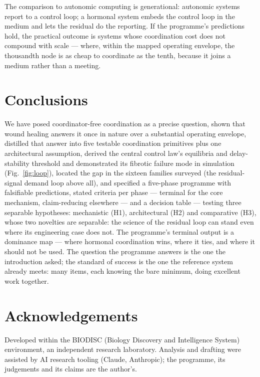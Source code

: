 \documentclass[twoside,twocolumn,usenatbib]{mnras}
\begin{document}
The comparison to autonomic computing
\citep{kephart2003} is generational: autonomic systems report to a
control loop; a hormonal system embeds the control loop in the
medium and lets the residual do the reporting. If the programme's
predictions hold, the practical outcome is systems whose coordination
cost does not compound with scale --- where, within the mapped
operating envelope, the thousandth node is as
cheap to coordinate as the tenth, because it joins a medium rather
than a meeting.

\section{Conclusions}
\label{sec:conclusions}

We have posed coordinator-free coordination as a precise question,
shown that wound healing answers it once in nature over a substantial
operating envelope, distilled that answer into five testable
coordination primitives plus one architectural assumption,
derived the central control law's equilibria and delay-stability
threshold and demonstrated its fibrotic failure mode in
simulation (Fig.~\ref{fig:loop}), located the
gap in the sixteen families surveyed (the residual-signal demand loop
above all), and specified a five-phase programme with falsifiable
predictions, stated criteria per phase --- terminal for the core
mechanism, claim-reducing elsewhere --- and a decision table ---
testing
three separable hypotheses: mechanistic (H1), architectural (H2) and
comparative (H3), whose two novelties are separable: the science of
the residual loop can stand even where its engineering case does not.
The programme's terminal output is a dominance map --- where hormonal
coordination wins, where it ties, and where it should not be used.
The
question the programme answers is the one the introduction asked; the
standard of success is the one the reference system already meets:
many items, each knowing the bare minimum, doing excellent work
together.

\section*{Acknowledgements}

Developed within the BIODISC (Biology Discovery and Intelligence
System) environment, an independent research laboratory. Analysis and
drafting were assisted by AI research tooling (Claude, Anthropic);
the programme, its judgements and its claims are the author's.
\end{document}
